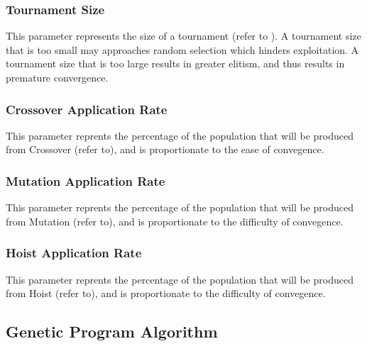\documentclass[a4paper,12pt]{article}
\begin{document}
        \subsubsection*{Tournament Size} \label{subsubsec:ts}
            \par{
                \noindent 
                This parameter represents the size of a tournament (refer to ). A tournament size that is too small may approaches random selection which hinders exploitation.
                A tournament size that is too large results in greater elitism, and thus results in premature convergence. 
            }
        \subsubsection*{Crossover Application Rate} \label{subsubsec:car}
            \par{
                \noindent
                This parameter reprents the percentage of the population that will be produced from Crossover (refer to), and is proportionate to the ease of convegence.
            }
        \subsubsection*{Mutation Application Rate} \label{subsubsec:mar}
            \par{
                \noindent
                This parameter reprents the percentage of the population that will be produced from Mutation (refer to), and is proportionate to the difficulty of convegence.
            }
        \subsubsection*{Hoist Application Rate} \label{subsubsec:har}
            \par{
                \noindent
                This parameter reprents the percentage of the population that will be produced from Hoist (refer to), and is proportionate to the difficulty of convegence.
            }
    \subsection{Genetic Program Algorithm}
\end{document}
